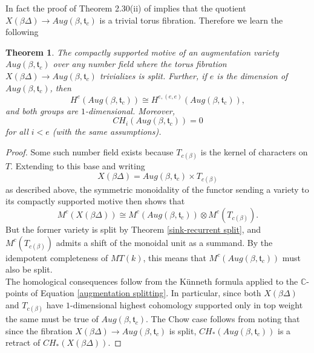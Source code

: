 \documentclass[11pt]{amsart}
\newtheorem{thm}{Theorem}[section]
\theoremstyle{definition}
\theoremstyle{remark}
\numberwithin{equation}{section}
\begin{document}
In fact the proof of Theorem 2.30(ii) of \cite{MR5110495} implies that the quotient $X(\beta \Delta) \rightarrow Aug(\beta, \mathfrak{t}_c)$ is a trivial torus fibration. Therefore we learn the following

\begin{thm}\label{augmentation vanishing}
    The compactly supported motive of an augmentation variety $Aug(\beta, \mathfrak{t}_c)$ over any number field where the torus fibration $X(\beta \Delta) \rightarrow Aug(\beta, \mathfrak{t}_c)$ trivializes is split. Further, if $e$ is the dimension of $Aug(\beta, \mathfrak{t}_c)$, then \begin{equation}
        H^e(Aug(\beta, \mathfrak{t}_c)) \cong H^{e, (e, e)}(Aug(\beta, \mathfrak{t}_c)),
    \end{equation} and both groups are $1$-dimensional. Moreover, $$CH_i(Aug(\beta, \mathfrak{t}_c)) = 0$$ for all $i < e$ (with the same assumptions).
\end{thm}

\begin{proof}
    Some such number field exists because $T_{c(\beta)}$ is the kernel of characters on $T$. Extending to this base and writing \begin{equation}\label{augmentation splitting}
        X(\beta \Delta) = Aug(\beta, \mathfrak{t}_c) \times T_{c(\beta)}
    \end{equation} \noindent as described above, the symmetric monoidality of the functor sending a variety to its compactly supported motive then shows that \begin{equation}
        M^c(X(\beta \Delta)) \cong M^c(Aug(\beta, \mathfrak{t}_c)) \otimes M^c(T_{c(\beta)}).
    \end{equation} But the former variety is split by Theorem \ref{sink-recurrent split}, and $M^c(T_{c(\beta)})$ admits a shift of the monoidal unit as a summand. By the idempotent completeness of $MT(k)$, this means that $M^c(Aug(\beta, \mathfrak{t}_c))$ must also be split.\\

    The homological consequences follow from the K\"unneth formula applied to the $\mathbb{C}$-points of Equation \ref{augmentation splitting}. In particular, since both $X(\beta \Delta)$ and $T_{c(\beta)}$ have $1$-dimensional highest cohomology supported only in top weight the same must be true of $Aug(\beta, \mathfrak{t}_c)$. The Chow case follows from noting that since the fibration $X(\beta \Delta) \rightarrow Aug(\beta, \mathfrak{t}_c)$ is split, $CH_*(Aug(\beta, \mathfrak{t}_c))$ is a retract of $CH_*(X(\beta \Delta))$. 
\end{proof}
\end{document}
